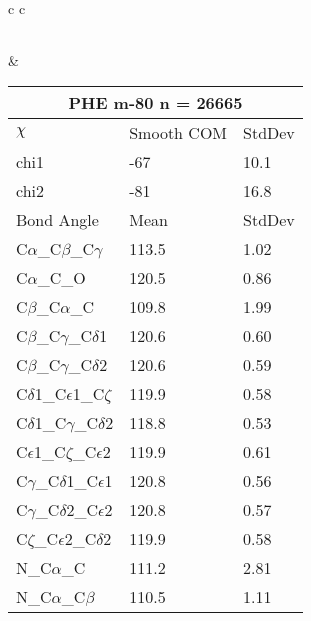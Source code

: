 \begin{longtable}{ c c }
\begin{tabular}{ l l l }
  \bottomrule
  \end{tabular}
  &
  \begin{tabular}{ l l l }
  \toprule
  \multicolumn{3}{c}{PHE \textbf{m-80} n = 26665} \\ \toprule
  $\chi$       & Smooth COM & StdDev \\ \midrule
  chi1 & -67 & 10.1 \\ 
  chi2 & -81 & 16.8 \\ \midrule
  Bond Angle   & Mean     & StdDev \\ \midrule
  C$\alpha$\_C$\beta$\_C$\gamma$ & 113.5 & 1.02\\
  C$\alpha$\_C\_O & 120.5 & 0.86\\
  C$\beta$\_C$\alpha$\_C & 109.8 & 1.99\\
  C$\beta$\_C$\gamma$\_C$\delta$1 & 120.6 & 0.60\\
  C$\beta$\_C$\gamma$\_C$\delta$2 & 120.6 & 0.59\\
  C$\delta$1\_C$\epsilon$1\_C$\zeta$ & 119.9 & 0.58\\
  C$\delta$1\_C$\gamma$\_C$\delta$2 & 118.8 & 0.53\\
  C$\epsilon$1\_C$\zeta$\_C$\epsilon$2 & 119.9 & 0.61\\
  C$\gamma$\_C$\delta$1\_C$\epsilon$1 & 120.8 & 0.56\\
  C$\gamma$\_C$\delta$2\_C$\epsilon$2 & 120.8 & 0.57\\
  C$\zeta$\_C$\epsilon$2\_C$\delta$2 & 119.9 & 0.58\\
  N\_C$\alpha$\_C & 111.2 & 2.81\\
  N\_C$\alpha$\_C$\beta$ & 110.5 & 1.11\\
  \bottomrule
  \end{tabular}
  \\
  
\end{longtable}

\newpage

